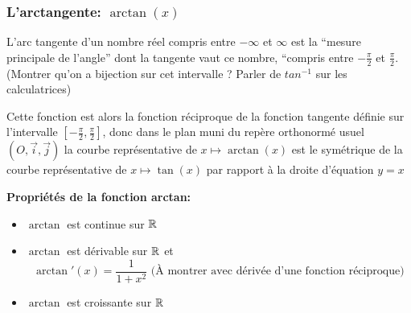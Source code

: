 \subsubsection{L'arctangente: $\arctan(x)$}

L'arc tangente d'un nombre réel compris entre $-\infty$ et $\infty$ est la ``mesure principale
de l'angle'' dont la tangente vaut ce nombre, ``compris entre  $-\frac{\pi}{2}$ et
$\frac{\pi}{2}$. (Montrer qu'on a bijection sur cet intervalle ? Parler de $tan^{-1}$ sur
les calculatrices)

Cette fonction est alors la fonction réciproque de la fonction tangente définie
sur l'intervalle $[-\frac{\pi}{2},\frac{\pi}{2}]$, donc dans le plan muni du repère orthonormé usuel
$(O,\vec{i}, \vec{j})$ la courbe représentative de $x \mapsto \arctan(x)$ est le
symétrique de la courbe représentative de $x \mapsto \tan(x)$ par rapport à
la droite d'équation $y=x$

\begin{center}
\end{center}

\textbf{Propriétés de la fonction arctan: }
\begin{itemize}[label=$\bullet$, leftmargin=2cm]
\item $\arctan$ est continue sur  $\mathbb{R}$
\item $\arctan$ est dérivable sur $\mathbb{R}$ et
  \[
    \arctan'(x)=\frac{1}{1+x^2} \text{ (À montrer avec dérivée
      d'une fonction réciproque)}
  \]
\item $\arctan$ est croissante sur $\mathbb{R}$
\end{itemize}

